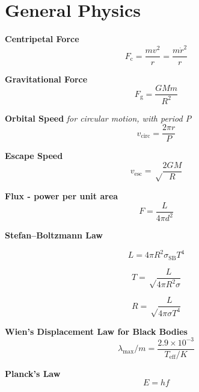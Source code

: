 \documentclass{spy}
\begin{document}
\newpage

\section {General Physics}

\textbf {Centripetal Force} 
\begin{equation}\label{centripetal_force}
F_\mathrm{c} = \frac {m v^2}{r} = \frac {m \dot{r}^2}{r} 
\end{equation}

\textbf {Gravitational Force} 
\begin{equation} \label{gravitational_force}
F_\mathrm{g} = \frac {G M m} {R^2} 
\end{equation}

\textbf {Orbital Speed}
\textit{for circular motion, with period P}
\begin{equation} \label{orbital_speed}
v_\mathrm{circ} = \frac {2 \pi r}{P}
\end{equation}
 
\textbf {Escape Speed}
\begin{equation}
v_\mathrm{esc} = \sqrt \frac {2 G M} {R}
\end{equation}

\textbf {Flux - power per unit area}
\begin{equation}
F = \frac {L} {4 \pi d^2}
\end{equation}

\textbf {Stefan–Boltzmann Law}

\begin{equation}
L = 4 \pi R^2 \sigma_\mathrm{SB} T^4
\end{equation}

\begin{equation}
T = \sqrt  \frac {L}{4 \pi R^2 \sigma}
\end{equation}

\begin{equation}
R = \sqrt \frac {L}{4 \pi \sigma T^4}
\end{equation}

\textbf {Wien's Displacement Law for Black Bodies}
\begin{equation}
\lambda_\mathrm{max}/m = \frac {2.9 \times 10^{-3}}{T_\mathrm{eff}/K}
\end{equation}

\textbf {Planck's Law}
\begin{equation}
E = hf
\end{equation}
\end{document}
